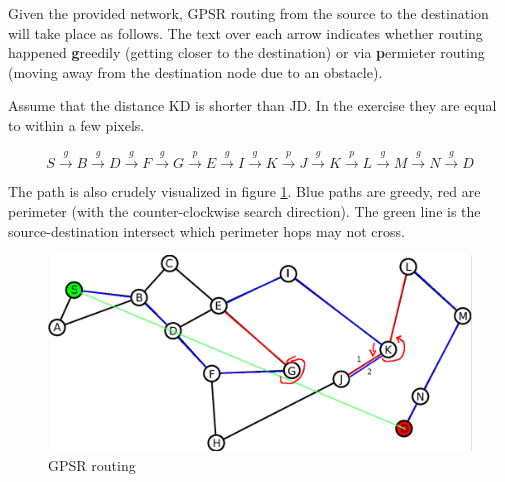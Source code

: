 \documentclass[a4paper]{scrreprt}
\begin{document}
Given the provided network, GPSR routing from the source to the destination
will take place as follows. The text over each arrow indicates whether routing
happened \textbf{g}reedily (getting closer to the destination) or via
\textbf{p}ermieter routing (moving away from the destination node due to an
obstacle).

Assume that the distance KD is shorter than JD. In the exercise they are equal
to within a few pixels.

\[
		S \xrightarrow{g} B \xrightarrow{g} D \xrightarrow{g} F \xrightarrow{g}
		G \xrightarrow{p} E \xrightarrow{g} I \xrightarrow{g} K \xrightarrow{p}
		J \xrightarrow{g} K \xrightarrow{p} L \xrightarrow{g} M \xrightarrow{g}
		N \xrightarrow{g} D
\]

The path is also crudely visualized in figure \ref{fig:gpsr_routing}. Blue paths are
greedy, red are perimeter (with the counter-clockwise search direction). The
green line is the source-destination intersect which perimeter hops may not
cross.

\begin{figure}[h]
        \centering
        \includegraphics[width=\textwidth]{network}
        \caption{GPSR routing}
        \label{fig:gpsr_routing}
\end{figure}
\end{document}
